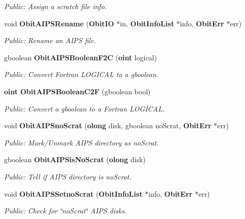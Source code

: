 \begin{CompactItemize}
\begin{CompactList}\small\item\em Public: Assign a scratch file info. \item\end{CompactList}\item 
void {\bf Obit\-AIPSRename} ({\bf Obit\-IO} $\ast$in, {\bf Obit\-Info\-List} $\ast$info, {\bf Obit\-Err} $\ast$err)
\begin{CompactList}\small\item\em Public: Rename an AIPS file. \item\end{CompactList}\item 
gboolean {\bf Obit\-AIPSBoolean\-F2C} ({\bf oint} logical)
\begin{CompactList}\small\item\em Public: Convert Fortran LOGICAL to a gboolean. \item\end{CompactList}\item 
{\bf oint} {\bf Obit\-AIPSBoolean\-C2F} (gboolean bool)
\begin{CompactList}\small\item\em Public: Convert a gboolean to a Fortran LOGICAL. \item\end{CompactList}\item 
void {\bf Obit\-AIPSno\-Scrat} ({\bf olong} disk, gboolean no\-Scrat, {\bf Obit\-Err} $\ast$err)
\begin{CompactList}\small\item\em Public: Mark/Unmark AIPS directory as no\-Scrat. \item\end{CompactList}\item 
gboolean {\bf Obit\-AIPSis\-No\-Scrat} ({\bf olong} disk)
\begin{CompactList}\small\item\em Public: Tell if AIPS directory is no\-Scrat. \item\end{CompactList}\item 
void {\bf Obit\-AIPSSetno\-Scrat} ({\bf Obit\-Info\-List} $\ast$info, {\bf Obit\-Err} $\ast$err)
\begin{CompactList}\small\item\em Public: Check for \char`\"{}no\-Scrat\char`\"{} AIPS disks. \item\end{CompactList}\end{CompactItemize}
